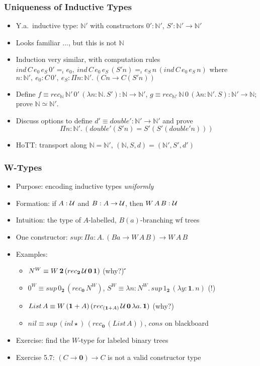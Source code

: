 \documentclass[handout]{beamer}
\newcommand{\depi}[3]{\Pi{#1{:}#2.\,#3}}
\newcommand{\lam}[2]{\lambda{#1.\,#2}}
\newcommand{\lamt}[3]{\lambda{#1{:}#2.\,#3}}
\newcommand{\Nat}{\mathbb{N}}
\newcommand{\UU}{{\cal U}}
\newcommand{\bfnull}{\mathbf{0}}
\newcommand{\bfone}{\mathbf{1}}
\newcommand{\bftwo}{\mathbf{2}}
\begin{document}
\frame
  {
    \frametitle{Uniqueness of Inductive Types}

    \begin{itemize}[<+->]
    \item Y.a.\ inductive type: $\Nat'$ with constructors $0':\Nat'$, $S' : \Nat'\to\Nat'$
    \item Looks familiar ..., but this is not $\Nat$
    \item Induction very similar, with computation rules
      $ind\, C\, e_0\, e_S\, 0' =_\iota e_0, ~ind\,C\,e_0\,e_S\,(S' n) =_\iota e_S\,n\,(ind\,C\,e_0\,e_S\,n)$
      where  $n:\Nat',~e_0 : C\,0', ~e_S : \depi{n}{\Nat'}{({Cn}\to{C(S'n)})}$
    \item Define $f \equiv rec_{\Nat}\,\Nat'\,0'\,(\lamt{n}{\Nat}{S'}): \Nat\to\Nat'$, 
     $g \equiv rec_{\Nat'}\,\Nat\,0\,(\lamt{n}{\Nat'}{S}): \Nat'\to\Nat$; prove $\Nat\simeq\Nat'$.
    \item Discuss options to define $d'\equiv double':\Nat'\to\Nat'$ and prove 
    \[\depi{n}{\Nat'}{(double'(S' n) = S'(S' (double' n)))}\]
    \item HoTT: transport along $\Nat=\Nat'$, $(\Nat,S,d)=(\Nat',S',d')$
    \end{itemize}
  }


\frame
  {
    \frametitle{W-Types}

    \begin{itemize}[<+->]
    \item Purpose: encoding inductive types \emph{uniformly}
    \item Formation: if $A:\UU$ and $B:A\to\UU$, then $W\,A\,B :\UU$
    \item Intuition: the type of $A$-labelled, $B(a)$-branching wf trees
    \item One constructor: $sup:\depi{a}{A}{(Ba\to W\,A\,B)\to W\,A\,B}$
    \item Examples:
      \begin{itemize}[<+->]
      \item $N^W \equiv W\,\bftwo\,(rec_{\bftwo}\,\UU\,\bfnull\,\bfone)$ (why?)      
      ̈́\item $0^W \equiv sup\,0_{\bftwo}\,(rec_{\bfnull}\,N^W)$, 
               $S^W \equiv \lamt{n}{N^W}{sup\,1_{\bftwo}\,(\lamt{y}{\bfone}{n})}$ (!)
      \item $List\,A \equiv W\,(\bfone+A)\,(rec_{(\bfone+A)}\,\UU\,\bfnull\,\lam{a}{\bfone})$ (why?)
      \item $nil \equiv sup\,(inl\star)\,(rec_{\bfnull}\,(List\,A))$, $cons$ on blackboard
      \end{itemize}    
    \item Exercise: find the $W$-type for labeled binary trees
    \item Exercise 5.7: $(C\to\bfnull)\to C$ is not a valid constructor type
    \end{itemize}
  }
\end{document}
